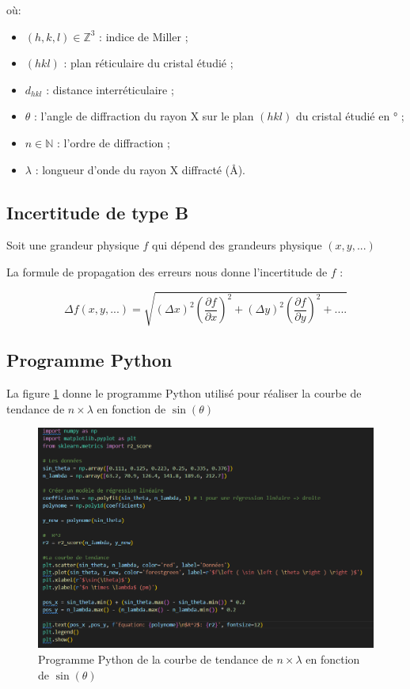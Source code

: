 \documentclass[12pt,a4paper]{article}
\begin{document}
où:

\begin{itemize}
	
		\item $\left ( h,k,l \right ) \in \mathbb{Z}^3$ : indice de Miller ;
	
	\item $(hkl)$ : plan réticulaire du cristal étudié ;
	
	\item $d_{hkl}$ : distance interréticulaire ;
	 
	
	\item $\theta $ : l'angle de diffraction du rayon X sur le plan $(hkl)$ du cristal étudié en ° ;
	
	\item $n \in \mathbb{N}$ : l'ordre de diffraction ;
	
	\item $\lambda $ : longueur d'onde du rayon X diffracté (\AA).
\end{itemize}
\subsection{Incertitude de type B}
Soit une grandeur physique $f$ qui dépend des grandeurs physique $(x,y,...)$ 

La formule de propagation des erreurs nous donne l'incertitude de $f$ :

\begin{equation}\label{eq: Type B}
	\Delta f(x,y,...) = \sqrt{\left ( \Delta x \right )^2 \left ( \frac{\partial f}{\partial x} \right )^2 + \left ( \Delta y \right )^2 \left ( \frac{\partial f}{\partial y} \right )^2 + .... }
\end{equation}

\newpage
\subsection{Programme Python}
La figure \ref{fig:photocode} donne le programme Python utilisé pour réaliser la courbe de tendance de $n \times \lambda$ en fonction de $\sin(\theta)$
\begin{figure}[h!]
	\centering
	\includegraphics[width=1\linewidth]{Python/Photo_code}
	\caption{Programme Python de la courbe de tendance de $n \times \lambda$ en fonction de $\sin(\theta)$}
	\label{fig:photocode}
\end{figure}
\end{document}
